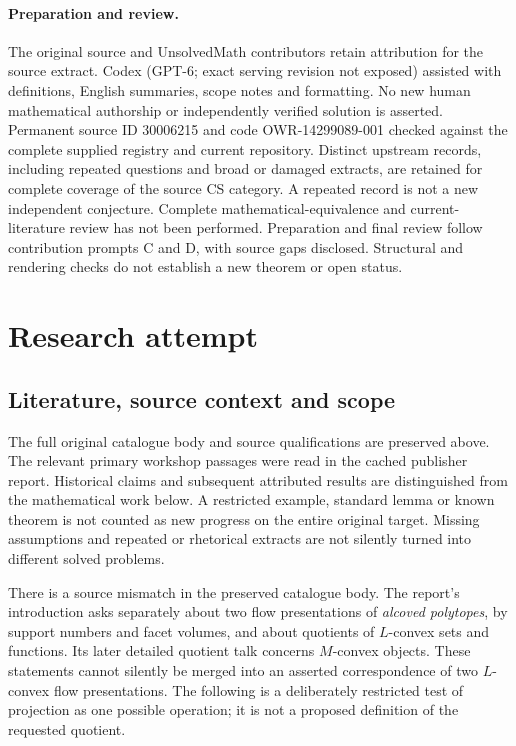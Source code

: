 \documentclass[11pt]{article}
\begin{document}
\paragraph{Preparation and review.}
The original source and UnsolvedMath contributors retain attribution for the source extract. Codex (GPT-6; exact serving revision not exposed) assisted with definitions, English summaries, scope notes and formatting. No new human mathematical authorship or independently verified solution is asserted. Permanent source ID 30006215 and code OWR-14299089-001 checked against the complete supplied registry and current repository. Distinct upstream records, including repeated questions and broad or damaged extracts, are retained for complete coverage of the source CS category. A repeated record is not a new independent conjecture. Complete mathematical-equivalence and current-literature review has not been performed. Preparation and final review follow contribution prompts C and D, with source gaps disclosed. Structural and rendering checks do not establish a new theorem or open status.
\label{end:30006215}

\section{Research attempt}
\subsection{Literature, source context and scope}
The full original catalogue body and source qualifications are preserved above. The relevant primary workshop passages were read in the cached publisher report. Historical claims and subsequent attributed results are distinguished from the mathematical work below. A restricted example, standard lemma or known theorem is not counted as new progress on the entire original target. Missing assumptions and repeated or rhetorical extracts are not silently turned into different solved problems.

There is a source mismatch in the preserved catalogue body. The report's introduction asks separately about two flow presentations of \emph{alcoved polytopes}, by support numbers and facet volumes, and about quotients of $L$-convex sets and functions. Its later detailed quotient talk concerns $M$-convex objects. These statements cannot silently be merged into an asserted correspondence of two $L$-convex flow presentations. The following is a deliberately restricted test of projection as one possible operation; it is not a proposed definition of the requested quotient.
\end{document}
